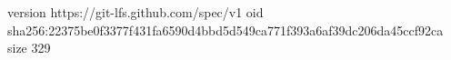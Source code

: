 version https://git-lfs.github.com/spec/v1
oid sha256:22375be0f3377f431fa6590d4bbd5d549ca771f393a6af39dc206da45ccf92ca
size 329
